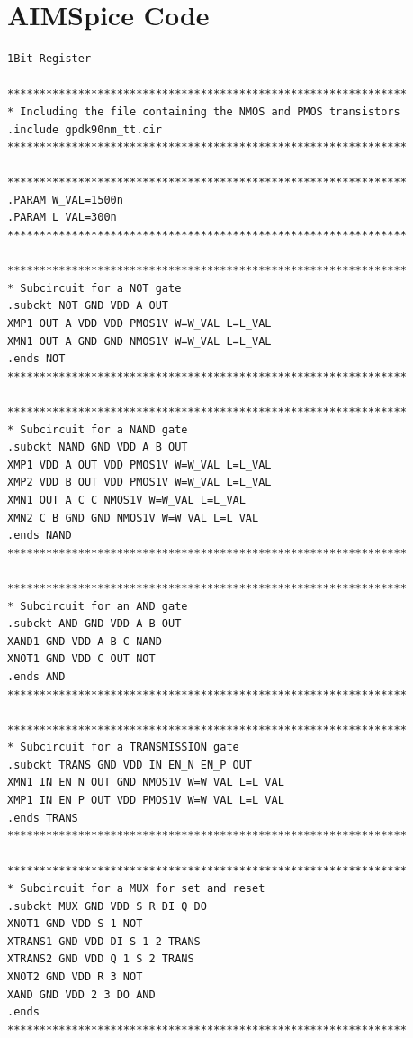 \appendix

\section{AIMSpice Code}
\label{appendix:aimspice}

\begin{lstlisting}[style=aimspiceStyle, caption=1-bit register in AIMSPICE, label=testcode]
1Bit Register

**************************************************************
* Including the file containing the NMOS and PMOS transistors
.include gpdk90nm_tt.cir
**************************************************************

**************************************************************
.PARAM W_VAL=1500n
.PARAM L_VAL=300n
**************************************************************

**************************************************************
* Subcircuit for a NOT gate 
.subckt NOT GND VDD A OUT
XMP1 OUT A VDD VDD PMOS1V W=W_VAL L=L_VAL 
XMN1 OUT A GND GND NMOS1V W=W_VAL L=L_VAL
.ends NOT
**************************************************************

**************************************************************
* Subcircuit for a NAND gate 
.subckt NAND GND VDD A B OUT
XMP1 VDD A OUT VDD PMOS1V W=W_VAL L=L_VAL 
XMP2 VDD B OUT VDD PMOS1V W=W_VAL L=L_VAL 
XMN1 OUT A C C NMOS1V W=W_VAL L=L_VAL 
XMN2 C B GND GND NMOS1V W=W_VAL L=L_VAL 
.ends NAND
**************************************************************

**************************************************************
* Subcircuit for an AND gate 
.subckt AND GND VDD A B OUT
XAND1 GND VDD A B C NAND
XNOT1 GND VDD C OUT NOT
.ends AND
**************************************************************

**************************************************************
* Subcircuit for a TRANSMISSION gate 
.subckt TRANS GND VDD IN EN_N EN_P OUT
XMN1 IN EN_N OUT GND NMOS1V W=W_VAL L=L_VAL
XMP1 IN EN_P OUT VDD PMOS1V W=W_VAL L=L_VAL 
.ends TRANS
**************************************************************

**************************************************************
* Subcircuit for a MUX for set and reset
.subckt MUX GND VDD S R DI Q DO
XNOT1 GND VDD S 1 NOT
XTRANS1 GND VDD DI S 1 2 TRANS
XTRANS2 GND VDD Q 1 S 2 TRANS
XNOT2 GND VDD R 3 NOT
XAND GND VDD 2 3 DO AND
.ends 
**************************************************************


\end{lstlisting}
